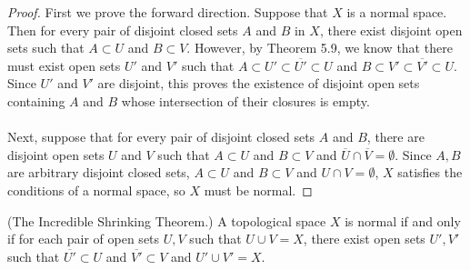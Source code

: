 \documentclass[a4paper,12pt,twoside]{hmcpset}
\begin{document}
\begin{proof}
    First we prove the forward direction. Suppose that $X$ is a normal
    space. Then for every pair of disjoint closed sets $A$ and $B$ in
    $X$, there exist disjoint open sets such that $A \subset U$ and $B
    \subset V$. However, by Theorem 5.9, we know that there must exist
    open sets $U'$ and $V'$ such that $A \subset U' \subset
    \overline{U'} \subset U$ and $B \subset V' \subset \overline{V'}
    \subset U$. Since $U'$ and $V'$ are disjoint, this proves the
    existence of disjoint open sets containing $A$ and $B$ whose
    intersection of their closures is empty. \\
    \\
    Next, suppose that for every pair of disjoint closed sets $A$ and
    $B$, there are disjoint open sets $U$ and $V$ such that $A \subset
    U$ and $B \subset V$ and $\overline{U} \cap \overline{V} =
    \emptyset$. Since $A, B$ are arbitrary disjoint closed sets, $A
    \subset U$ and $B \subset V$ and $U \cap V = \emptyset$, $X$
    satisfies the conditions of a normal space, so $X$ must be normal.
    
\end{proof}

\begin{problem}[Theorem 5.11](The Incredible Shrinking Theorem.) A
    topological space $X$ is normal if and only if for each pair of
    open sets $U, V$ such that $U \cup V = X$, there exist open sets
    $U', V'$ such that $\overline{U'} \subset U$ and $\overline{V'}
    \subset V$ and $U' \cup V' = X$.
\end{problem}
\end{document}
